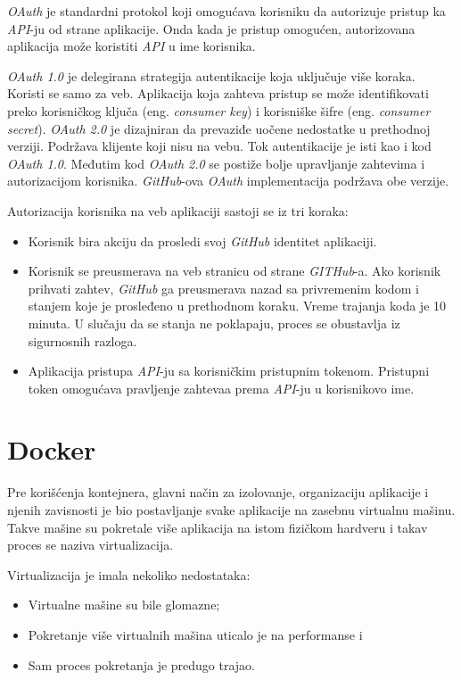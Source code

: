 \textit{OAuth} je standardni protokol koji omogućava korisniku da autorizuje pristup ka \textit{API}-ju 
od strane aplikacije. Onda kada je pristup omogućen, autorizovana aplikacija može koristiti 
\textit{API} u ime korisnika.

\textit{OAuth 1.0} je delegirana strategija autentikacije koja uključuje više koraka. 
Koristi se samo za veb. Aplikacija koja zahteva pristup se može identifikovati preko korisničkog 
ključa (eng. \textit{consumer key}) i korisniške šifre (eng. \textit{consumer secret}).
\textit{OAuth 2.0} je dizajniran da prevaziđe uočene nedostatke u prethodnoj verziji. 
Podržava klijente koji nisu na vebu. Tok autentikacije je isti kao i kod \textit{OAuth 1.0}. 
Međutim kod \textit{OAuth 2.0} se postiže bolje upravljanje zahtevima i autorizacijom korisnika.
\textit{GitHub}-ova \textit{OAuth} implementacija podržava obe verzije.

Autorizacija korisnika na veb aplikaciji sastoji se iz tri koraka:
\begin{itemize}
    \item Korisnik bira akciju da prosledi svoj \textit{GitHub} identitet aplikaciji.
    \item Korisnik se preusmerava na veb stranicu od strane \textit{GITHub}-a.
        Ako korisnik prihvati zahtev, \textit{GitHub} ga preusmerava nazad sa privremenim kodom i stanjem 
        koje je prosleđeno u prethodnom koraku. Vreme trajanja koda je 10 minuta. U slučaju da 
        se stanja ne poklapaju, proces se obustavlja iz sigurnosnih razloga.
    \item Aplikacija pristupa \textit{API}-ju sa korisničkim pristupnim tokenom. 
        Pristupni token omogućava pravljenje zahtevaa prema \textit{API}-ju u korisnikovo ime.
\end{itemize}

\section{Docker}\label{sec:docker}

Pre korišćenja kontejnera, glavni način za izolovanje, organizaciju aplikacije i njenih zavisnosti je 
bio postavljanje svake aplikacije na zasebnu virtualnu mašinu. Takve mašine su pokretale više aplikacija 
na istom fizičkom hardveru i takav proces se naziva virtualizacija.

Virtualizacija je imala nekoliko nedostataka: 
\begin{itemize}
    \item Virtualne mašine su bile glomazne;
    \item Pokretanje više virtualnih mašina uticalo je na performanse i
    \item Sam proces pokretanja je predugo trajao.
\end{itemize}

